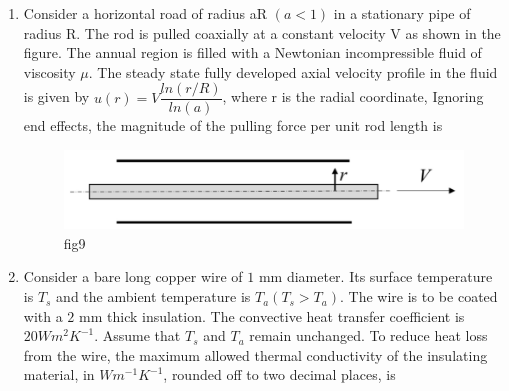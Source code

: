 \documentclass[journal]{IEEEtran}
\numberwithin{equation}{enumi}
\numberwithin{figure}{enumi}
\begin{document}
\begin{enumerate}[start=1, label={Q\arabic*.}]
\begin{enumerate}
  \end{enumerate}
\item Consider a horizontal road of radius aR $(a<1)$ in a stationary pipe of radius R. The rod is pulled coaxially at a constant velocity V as shown in the figure. The annual region is filled with a Newtonian incompressible fluid of viscosity $\mu$. The steady state fully developed axial velocity profile in the fluid is given by $u(r)=V \dfrac{ln(r/R)}{ln(a)}$, where r is the radial coordinate, Ignoring end effects, the magnitude of the pulling force per unit rod length is
\begin{figure}[H]
    \centering
    \includegraphics[width=0.5\linewidth]{figs/fig9.jpeg}
    \caption{fig9}
    \label{fig:9}
\end{figure}
\begin{enumerate} 
  \end{enumerate}
\item Consider a bare long copper wire of $1$ mm diameter. Its surface temperature is $T_s$ and the ambient temperature is $T_a(T_s > T_a)$. The wire is to be coated with a $2$ mm thick insulation. The convective heat transfer coefficient is $20 W m^2 K^{-1}$. Assume that  $T_s$ and $T_a$ remain unchanged. To reduce heat loss from the wire, the maximum allowed thermal conductivity of the insulating material, in $W m^{-1} K^{-1}$, rounded off to two decimal places, is
\begin{enumerate} 

\end{enumerate}
\end{enumerate}
\end{document}
